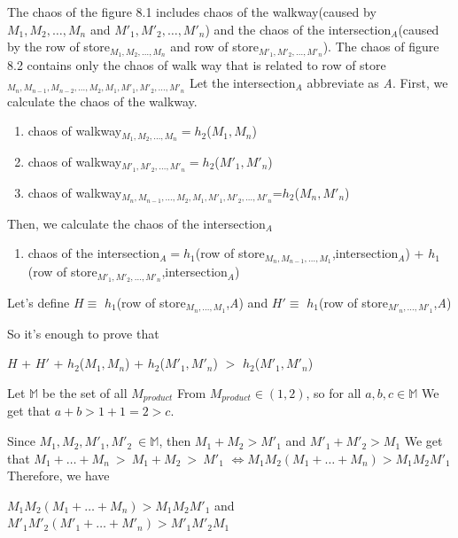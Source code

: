 The chaos of the figure 8.1 includes chaos of the walkway(caused by $M_1,M_2,\hdots,M_n$ and $M'_1,M'_2,\hdots,M'_n$) and the chaos of the intersection$_A$(caused by the row of store$_{M_1,M_2,\hdots,M_n}$ and row of store$_{M'_1,M'_2,\hdots,M'_n}$). The chaos of figure 8.2 contains only the chaos of walk way that is related to row of store$_{M_n,M_{n-1},M_{n-2},\hdots,M_2,M_1,M'_1,M'_2,\hdots,M'_n}$
Let the intersection$_A$ abbreviate as \emph{A}.
\newline
\newline
First, we calculate the chaos of the walkway.
\begin{enumerate}
    \item[] chaos of walkway$_{M_1,M_2,\hdots,M_n}=h_2$($M_1,M_n$)
    \item[] chaos of walkway$_{M'_1,M'_2,\hdots,M'_n}=h_2$($M'_1,M'_n$)
    \item[] chaos of walkway$_{M_n,M_{n-1},\hdots,M_2,M_1,M'_1,M'_2,\hdots,M'_n}$=$h_2$($M_n,M'_n$)
\end{enumerate}
\par
Then, we calculate the chaos of the intersection$_A$
\begin{enumerate}
    \item[] chaos of the intersection$_A=h_1$(row of store${_{M_n,M_{n-1},\hdots,M_1}}$,intersection$_A$) + $h_1$(row of store${_{M'_1,M'_2,\hdots,M'_n}}$,intersection$_A$)
\end{enumerate}
Let's define $H \equiv $ $h_1$(row of store$_{M_n,\hdots,M_1}$,\emph{A})
and 
$H' \equiv $ $h_1$(row of store$_{M'_n,\hdots,M'_1}$,\emph{A})

So it's enough to prove that 
\begin{center}
    $H$ + $H'$ + $h_2$($M_1,M_n$) + $h_2$($M'_1,M'_n$) $>$ $h_2$($M'_1,M'_n$)
\end{center}

\par
Let $\mathbb{M}$ be the set of all $M_{product}$
From $M_{product} \in (1,2)$, so for all $a,b,c \in \mathbb{M}$
We get that $a+b>1+1=2>c$.

Since $M_1,M_2,M'_1,M'_2\ \in \mathbb{M}$, then $M_1+M_2>M'_1$ and $M'_1+M'_2>M_1$
We get that
$M_1+\hdots+M_n\ >\ M_1+M_2\ >\ M'_1$ $\iff M_1M_2(M_1+\hdots+M_n)>M_1M_2M'_1$
\newline Therefore, we have
\begin{center}
    $M_1M_2(M_1+\hdots+M_n)>M_1M_2M'_1$ and $M'_1M'_2(M'_1+\hdots+M'_n)>M'_1M'_2M_1$
\end{center}

